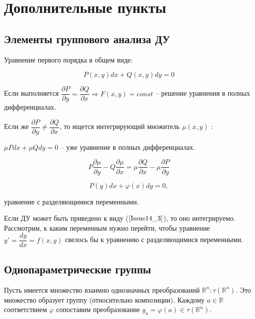 
\section{Дополнительные пункты}

\subsection{Элементы группового анализа ДУ}

Уравнение первого порядка в общем виде:

\begin{equation}
	P(x,y)dx + Q(x,y)dy = 0
	\label{Issue14_1}
\end{equation}

Если выполняется $\dfrac{\partial P}{\partial y} = \dfrac{\partial Q}{\partial x} \Rightarrow F(x,y) = const$ -- решение уравнения в полных дифференциалах.

Если же $\dfrac{\partial P}{\partial y} \neq \dfrac{\partial Q}{\partial x}$, то ищется интегрирующий множитель $\mu(x,y)$ :

$\mu Pdx + \mu Qdy = 0$ -- уже уравнение в полных дифференциалах.

\begin{equation}
	P\frac{\partial \mu}{\partial y} - Q \frac{\partial \mu}{\partial x} = \mu \dfrac{\partial Q}{\partial x} - \mu \dfrac{\partial P}{\partial y}
	\label{Issue14_2}
\end{equation}

\begin{equation}
	P(y)dx + \varphi(x)dy = 0,
	\label{Issue14_3}
\end{equation}

уравнение с разделяющимися переменными.

Если ДУ может быть приведено к виду ($\ref{Issue14_3}$), то оно интегрируемо. Рассмотрим, к каким переменным нужно перейти, чтобы уравнение $y' = \dfrac{dy}{dx} = f(x,y)$ свелось бы к уравнению с разделяющимися переменными.

\subsection{Однопараметрические группы}

Пусть имеется множество взаимно однозначных преобразований $\mathbb{R}^n: \tau(\mathbb{R}^n)$.
Это множество образует группу (относительно композиции). Каждому $a \in \mathbb{R}$ соответствием $\varphi$ сопоставим преобразование $g_a = \varphi(a) \in \tau(\mathbb{R}^n)$.

